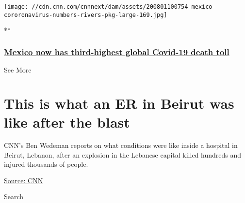 \href{/videos/world/2020/08/01/mexico-coronavirus-death-toll-rivers-pkg-vpx.cnn/video/playlists/around-the-world/}{}

\texttt{[image: //cdn.cnn.com/cnnnext/dam/assets/200801100754-mexico-cororonavirus-numbers-rivers-pkg-large-169.jpg]}

**

\hypertarget{mexico-now-has-third-highest-global-covid-19-death-toll}{%
\subsubsection{\texorpdfstring{\href{/videos/world/2020/08/01/mexico-coronavirus-death-toll-rivers-pkg-vpx.cnn/video/playlists/around-the-world/}{Mexico
now has third-highest global Covid-19 death
toll}}{Mexico now has third-highest global Covid-19 death toll}}\label{mexico-now-has-third-highest-global-covid-19-death-toll}}

See More

\hypertarget{this-is-what-an-er-in-beirut-was-like-after-the-blast-2}{%
\section{This is what an ER in Beirut was like after the
blast}\label{this-is-what-an-er-in-beirut-was-like-after-the-blast-2}}

CNN's Ben Wedeman reports on what conditions were like inside a hospital
in Beirut, Lebanon, after an explosion in the Lebanese capital killed
hundreds and injured thousands of people.

\href{www.cnn.com}{Source: CNN}

Search

